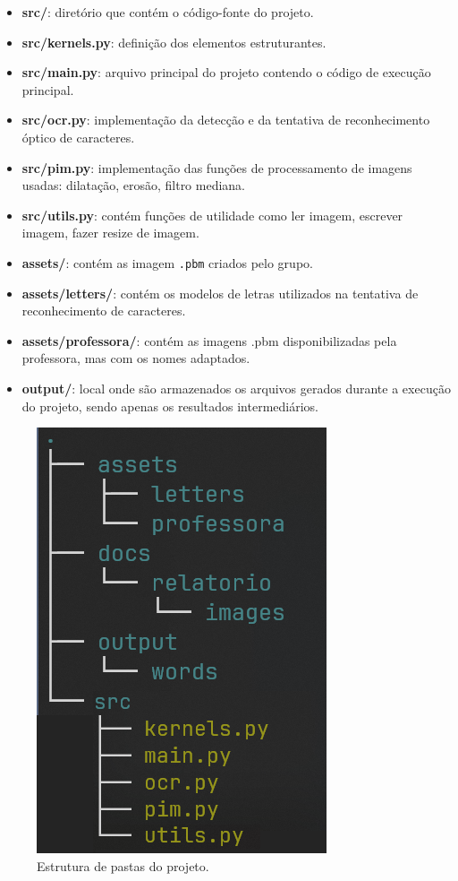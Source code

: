 \documentclass[english, 
               brazil, 
               bsc] %
               {dcomp-abntex2}
\begin{document}
\begin{itemize}
\item \textbf{src/}: diretório que contém o código-fonte do projeto.
\item \textbf{src/kernels.py}: definição dos elementos estruturantes.
\item \textbf{src/main.py}: arquivo principal do projeto contendo o código de execução principal.
\item \textbf{src/ocr.py}: implementação da detecção e da tentativa de reconhecimento óptico de caracteres.
\item \textbf{src/pim.py}: implementação das funções de processamento de imagens usadas: dilatação, erosão, filtro mediana.
\item \textbf{src/utils.py}: contém funções de utilidade como ler imagem, escrever imagem, fazer resize de imagem.
\item \textbf{assets/}: contém as imagem \texttt{.pbm} criados pelo grupo.
\item \textbf{assets/letters/}: contém os modelos de letras utilizados na tentativa de reconhecimento de caracteres.
\item \textbf{assets/professora/}: contém as imagens .pbm disponibilizadas pela professora, mas com os nomes adaptados.
\item \textbf{output/}: local onde são armazenados os arquivos gerados durante a execução do projeto, sendo apenas os resultados intermediários.
\end{itemize}


\begin{figure}[htb]
\caption{\small Estrutura de pastas do projeto.}
\label{folders}
    \begin{center}
    \includegraphics[scale=0.65]{./images/folders.png}
    \end{center}
\end{figure}
\end{document}
